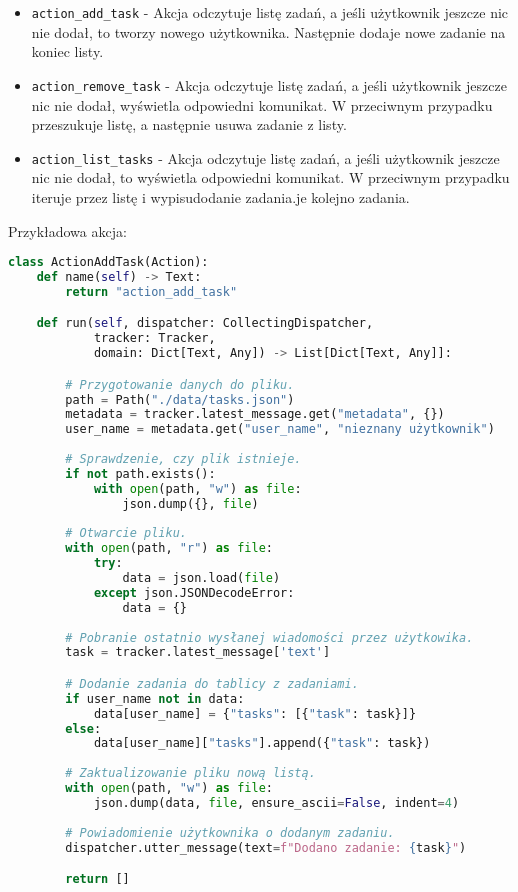 \documentclass{article}
\begin{document}
\begin{itemize}
    \item[\textcolor{violet}{\textbullet}] \verb|action_add_task| - Akcja odczytuje listę zadań, a jeśli
        użytkownik jeszcze nic nie dodał, to tworzy nowego użytkownika.
        Następnie dodaje nowe zadanie na koniec listy.
    \item[\textcolor{violet}{\textbullet}] \verb|action_remove_task| - Akcja odczytuje listę zadań, a jeśli
        użytkownik jeszcze nic nie dodał, wyświetla odpowiedni komunikat.
        W przeciwnym przypadku przeszukuje listę, a następnie usuwa zadanie
        z listy.
    \item[\textcolor{violet}{\textbullet}] \verb|action_list_tasks| - Akcja odczytuje listę zadań, a jeśli
        użytkownik jeszcze nic nie dodał, to wyświetla odpowiedni komunikat.
        W przeciwnym przypadku iteruje przez listę i wypisudodanie zadania.je kolejno zadania.
\end{itemize}
Przykładowa akcja:
\begin{lstlisting}[language=Python, caption=Akcja dodawania]
class ActionAddTask(Action):
    def name(self) -> Text:
        return "action_add_task"

    def run(self, dispatcher: CollectingDispatcher,
            tracker: Tracker,
            domain: Dict[Text, Any]) -> List[Dict[Text, Any]]:

        # Przygotowanie danych do pliku.
        path = Path("./data/tasks.json")
        metadata = tracker.latest_message.get("metadata", {})
        user_name = metadata.get("user_name", "nieznany użytkownik")
    
        # Sprawdzenie, czy plik istnieje.
        if not path.exists():
            with open(path, "w") as file:
                json.dump({}, file)
        
        # Otwarcie pliku.
        with open(path, "r") as file:
            try:
                data = json.load(file)
            except json.JSONDecodeError:
                data = {}
        
        # Pobranie ostatnio wysłanej wiadomości przez użytkowika.
        task = tracker.latest_message['text']

        # Dodanie zadania do tablicy z zadaniami.
        if user_name not in data:
            data[user_name] = {"tasks": [{"task": task}]}
        else:
            data[user_name]["tasks"].append({"task": task})
        
        # Zaktualizowanie pliku nową listą.
        with open(path, "w") as file:
            json.dump(data, file, ensure_ascii=False, indent=4)
        
        # Powiadomienie użytkownika o dodanym zadaniu.
        dispatcher.utter_message(text=f"Dodano zadanie: {task}")

        return []
\end{lstlisting}
\end{document}
